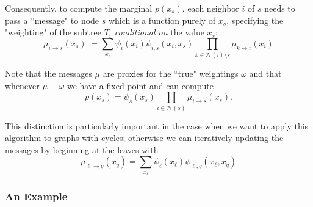 Consequently, to compute the marginal $p(x_s)$, each neighbor $i$ of $s$ needs to pass a ``message" to node $s$ which is a function purely of $x_s$, specifying the "weighting" of the subtree $T_i$ \emph{conditional on} the value $x_s$:
$$
\mu_{i\rightarrow s}(x_s) := \sum_{x_i} \psi_i(x_i) \psi_{i,s}(x_i, x_s) \prod_{k \in \mathcal{N}(i) \setminus s} \mu_{k\rightarrow i}(x_i)
$$

Note that the messages $\mu$ are proxies for the ``true" weightings $\omega$ and that whenever $\mu \equiv \omega$ we have a fixed point and can compute 
$$
p(x_s) = \psi_s(x_s) \prod_{i\in\mathcal{N}(s)} \mu_{i\rightarrow s}(x_s).
$$

This distinction is particularly important in the case when we want to apply this algorithm to graphs with cycles; otherwise we can iteratively updating the messages by beginning at the leaves  with
$$
\mu_{\ell\rightarrow q}(x_q) = \sum_{x_\ell} \psi_\ell(x_\ell) \psi_{\ell,q}(x_\ell, x_q)
$$

\subsubsection{An Example}